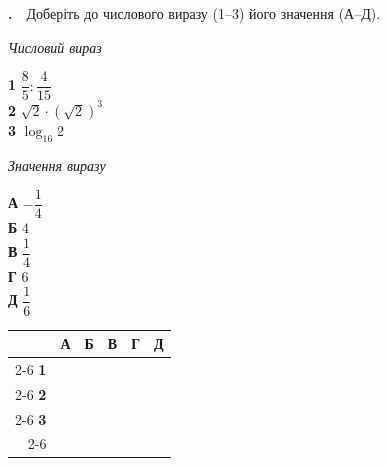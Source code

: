 \documentclass[12pt]{article}
\newcommand{\matchingGrid}{%
    \begingroup
    \renewcommand{\arraystretch}{1.15}
    \setlength{\tabcolsep}{4pt}
    \footnotesize
    \begin{tabular}{r|c|c|c|c|c|}
         \multicolumn{1}{c}{} & \multicolumn{1}{c}{\textbf{А}} & \multicolumn{1}{c}{\textbf{Б}} & \multicolumn{1}{c}{\textbf{В}} & \multicolumn{1}{c}{\textbf{Г}} & \multicolumn{1}{c}{\textbf{Д}} \\ \cline{2-6}
         \textbf{1} & \phantom{X} & \phantom{X} & \phantom{X} & \phantom{X} & \phantom{X} \\ \cline{2-6}
         \textbf{2} & & & & & \\ \cline{2-6}
         \textbf{3} & & & & & \\ \cline{2-6}
    \end{tabular}
    \endgroup
}
\newcounter{zad}
\newcommand{\zadtask}[1]{\stepcounter{zad}\par\vspace{0.3cm}\noindent\textbf{\thezad.}\ \ #1\par\vspace{0.2cm}}
\begin{document}
\zadtask{Доберіть до числового виразу (1--3) його значення (А--Д).\par
\vspace{0.3cm}
\noindent
\begin{minipage}[t]{0.42\textwidth}
\textit{Числовий вираз}\par\vspace{0.15cm}
\textbf{1} \quad $\dfrac{8}{5} : \dfrac{4}{15}$\\[0.35cm]
\textbf{2} \quad $\sqrt{2} \cdot \left(\sqrt{2}\right)^3$\\[0.35cm]
\textbf{3} \quad $\log_{16} 2$
\end{minipage}%
\hfill
\begin{minipage}[t]{0.3\textwidth}
\textit{Значення виразу}\par\vspace{0.15cm}
\textbf{А} \quad $-\dfrac{1}{4}$\\[0.2cm]
\textbf{Б} \quad $4$\\[0.15cm]
\textbf{В} \quad $\dfrac{1}{4}$\\[0.2cm]
\textbf{Г} \quad $6$\\[0.15cm]
\textbf{Д} \quad $\dfrac{1}{6}$
\end{minipage}%
\hfill
\begin{minipage}[t]{0.2\textwidth}
\vspace{0.4cm}
\begin{flushright}\matchingGrid\end{flushright}
\end{minipage}}
\end{document}
